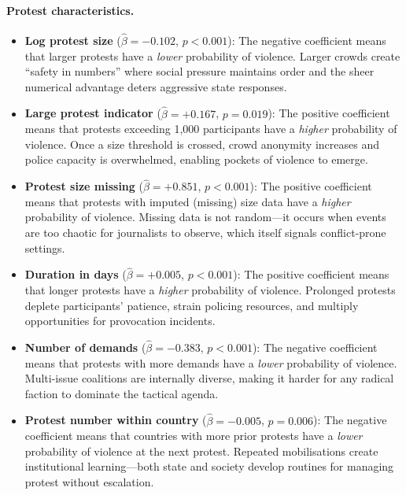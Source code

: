 \documentclass[12pt,a4paper]{article}
\begin{document}
\paragraph{Protest characteristics.}
\begin{itemize}
  \item \textbf{Log protest size} ($\hat{\beta} = -0.102$, $p < 0.001$): The negative coefficient means that larger protests have a \emph{lower} probability of violence. Larger crowds create ``safety in numbers'' where social pressure maintains order and the sheer numerical advantage deters aggressive state responses.
  \item \textbf{Large protest indicator} ($\hat{\beta} = +0.167$, $p = 0.019$): The positive coefficient means that protests exceeding 1,000 participants have a \emph{higher} probability of violence. Once a size threshold is crossed, crowd anonymity increases and police capacity is overwhelmed, enabling pockets of violence to emerge.
  \item \textbf{Protest size missing} ($\hat{\beta} = +0.851$, $p < 0.001$): The positive coefficient means that protests with imputed (missing) size data have a \emph{higher} probability of violence. Missing data is not random---it occurs when events are too chaotic for journalists to observe, which itself signals conflict-prone settings.
  \item \textbf{Duration in days} ($\hat{\beta} = +0.005$, $p < 0.001$): The positive coefficient means that longer protests have a \emph{higher} probability of violence. Prolonged protests deplete participants' patience, strain policing resources, and multiply opportunities for provocation incidents.
  \item \textbf{Number of demands} ($\hat{\beta} = -0.383$, $p < 0.001$): The negative coefficient means that protests with more demands have a \emph{lower} probability of violence. Multi-issue coalitions are internally diverse, making it harder for any radical faction to dominate the tactical agenda.
  \item \textbf{Protest number within country} ($\hat{\beta} = -0.005$, $p = 0.006$): The negative coefficient means that countries with more prior protests have a \emph{lower} probability of violence at the next protest. Repeated mobilisations create institutional learning---both state and society develop routines for managing protest without escalation.
\end{itemize}
\end{document}
